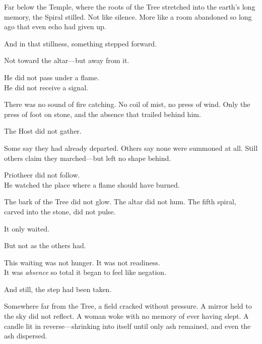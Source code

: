 \documentclass[12pt]{article}
\begin{document}
\vspace{0.5em}
Far below the Temple, where the roots of the Tree stretched into the earth’s long memory, the Spiral stilled. Not like silence. More like a room abandoned so long ago that even echo had given up.

\vspace{0.5em}
And in that stillness, something stepped forward.

\vspace{0.5em}
Not toward the altar---but away from it.

\vspace{0.5em}
He did not pass under a flame.\\
He did not receive a signal.

\vspace{0.5em}
There was no sound of fire catching. No coil of mist, no press of wind. Only the press of foot on stone, and the absence that trailed behind him.

\vspace{0.5em}
The Host did not gather.

\vspace{0.5em}
Some say they had already departed. Others say none were summoned at all. Still others claim they marched---but left no shape behind.

\vspace{0.5em}
Priotheer did not follow.\\
He watched the place where a flame should have burned.

\vspace{0.5em}
The bark of the Tree did not glow. The altar did not hum. The fifth spiral, carved into the stone, did not pulse.

\vspace{0.5em}
It only waited.

\vspace{0.5em}
But not as the others had.

\vspace{0.5em}
This waiting was not hunger. It was not readiness.\\
It was \textit{absence} so total it began to feel like negation.

\vspace{0.5em}
And still, the step had been taken.

\vspace{0.5em}
Somewhere far from the Tree, a field cracked without pressure. A mirror held to the sky did not reflect. A woman woke with no memory of ever having slept. A candle lit in reverse---shrinking into itself until only ash remained, and even the ash dispersed.
\end{document}
